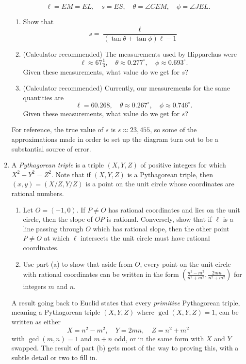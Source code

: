 \begin{enumerate}
\begin{equation*}
\ell = EM = EL,\quad s = ES,\quad\theta = \angle CEM,\quad\phi = \angle JEL.
\end{equation*}
\begin{enumerate}
\item Show that 
\begin{equation*}
s = \frac{\ell}{(\tan\theta + \tan\phi)\ell - 1}
\end{equation*}
\item (Calculator recommended) The measurements used by Hipparchus were
\begin{equation*}
\ell\approx 67\tfrac{1}{3},\quad\theta\approx 0.277^{\circ},\quad\phi\approx 0.693^{\circ}.
\end{equation*}
Given these measurements, what value do we get for $s$?
\item (Calculator recommended) Currently, our measurements for the same quantities are
\begin{equation*}
\ell = 60.268,\quad\theta\approx 0.267^{\circ},\quad\phi\approx 0.746^{\circ}.
\end{equation*}
Given these measurements, what value do we get for $s$?\par
\end{enumerate}
For reference, the true value of $s$ is $s\approx 23{,}455$, so some of the approximations made in order to set up the diagram turn out to be a substantial source of error.\newpage
\item A \emph{Pythagorean triple} is a triple $(X,Y,Z)$ of positive integers for which $X^2 + Y^2 = Z^2$. Note that if $(X,Y,Z)$ is a Pythagorean triple, then $(x,y) = (X/Z, Y/Z)$ is a point on the unit circle whose coordinates are rational numbers.
\begin{enumerate}
\item Let $O = (-1,0)$. If $P\neq O$ has rational coordinates and lies on the unit circle, then the slope of $\overline{OP}$ is rational. Conversely, show that if $\ell$ is a line passing through $O$ which has rational slope, then the other point $P\neq O$ at which $\ell$ intersects the unit circle must have rational coordinates.
\item Use part (a) to show that aside from $O$, every point on the unit circle with rational coordinates can be written in the form $\displaystyle\left(\frac{n^2 - m^2}{n^2 + m^2}, \frac{2mn}{n^2 + m^2}\right)$ for integers $m$ and $n$.
\end{enumerate}
A result going back to Euclid states that every \emph{primitive} Pythagorean triple, meaning a Pythagorean triple $(X,Y,Z)$ where $\gcd(X,Y,Z) = 1$, can be written as either
\begin{equation*}
X = n^2 - m^2,\quad Y = 2mn,\quad Z = n^2 + m^2
\end{equation*}
with $\gcd(m,n) = 1$ and $m + n$ odd, or in the same form with $X$ and $Y$ swapped. The result of part (b) gets most of the way to proving this, with a subtle detail or two to fill in.
\end{enumerate}


